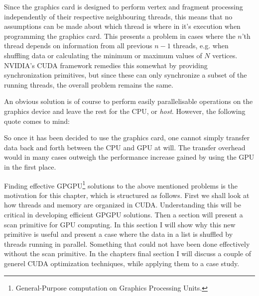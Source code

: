Since the graphics card is designed to perform vertex and fragment
processing independently of their respective neighbouring threads,
this means that no assumptions can be made about which thread is where
in it's execution when programming the graphics card. This presents a
problem in cases where the $n$'th thread depends on information from
all previous $n-1$ threads, e.g. when shuffling data or calculating
the minimum or maximum values of $N$ vertices. NVIDIA's CUDA framework
remedies this somewhat by providing synchronization primitives, but
since these can only synchronize a subset of the running threads, the
overall problem remains the same.


An obvious solution is of course to perform easily parallelisable
operations on the graphics device and leave the rest for the CPU, or
\textit{host}. However, the following quote comes to mind:


So once it has been decided to use the graphics card, one cannot
simply transfer data back and forth between the CPU and GPU at
will. The transfer overhead would in many cases outweigh the
performance increase gained by using the GPU in the first place.




Finding effective GPGPU\footnote{General-Purpose computation on
  Graphics Processing Units.} solutions to the above mentioned
problems is the motivation for this chapter, which is structured as
follows. First we shall look at how threads and memory are organized
in CUDA. Understanding this will be critical in developing efficient
GPGPU solutions. Then a section will present a scan primitive for GPU
computing. In this section I will show why this new primitive is
useful and present a case where the data in a list is shuffled by
threads running in parallel. Something that could not have been done
effectively without the scan primitive. In the chapters final section
I will discuss a couple of generel CUDA optimization techniques, while
applying them to a case study.

